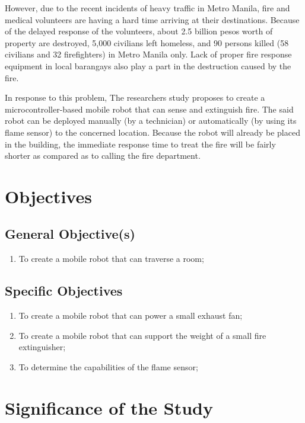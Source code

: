 		However, due to the recent incidents of heavy traffic in Metro Manila, fire and medical volunteers are having a hard time arriving at their destinations. Because of the delayed response of the volunteers, about 2.5 billion pesos worth of property are destroyed, 5,000 civilians left homeless, and 90 persons killed (58 civilians and 32 firefighters) in Metro Manila only. Lack of proper fire response equipment in local barangays also play a part in the destruction caused by the fire.
    
		In response to this problem, The researchers study proposes to create a microcontroller-based mobile robot that can sense and extinguish fire. The said robot can be deployed manually (by a technician) or automatically (by using its flame sensor) to the concerned location. Because the robot will already be placed in the building, the immediate response time to treat the fire will be fairly shorter as compared as to calling the fire department.

\section{Objectives}
\subsection{General Objective(s)}
\begin{enumerate}
	\item To create a mobile robot that can traverse a room;
\end{enumerate}

\subsection{Specific Objectives}

\begin{enumerate}
	\item To create a mobile robot that can power a small exhaust fan;
	
	\item To create a mobile robot that can support the weight of a small fire extinguisher;
	
	\item To determine the capabilities of the flame sensor;

\end{enumerate}



\section{Significance of the Study}

